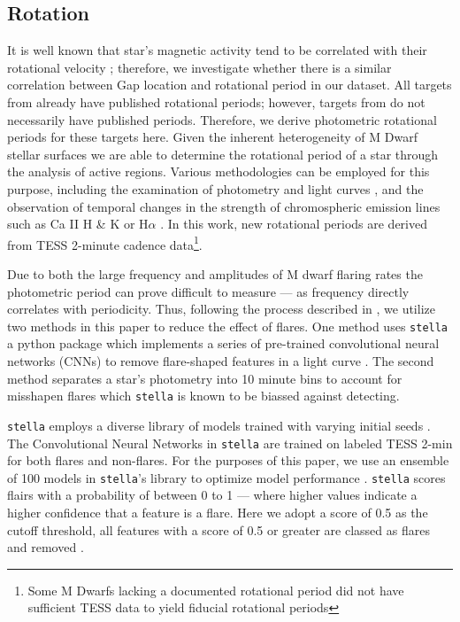 \subsection{Rotation}
It is well known that star's magnetic activity tend to be correlated with their
rotational velocity \citep{Vaughan1981, Newton2016, Astudillo-Defru2017,
Houdebine2017, Boudreaux2022}; therefore, we investigate whether there is a
similar correlation between Gap location and rotational period in our dataset.
All targets from \citet{Boudreaux2022} already have published rotational
periods; however, targets from \citet{Perdelwitz2021} do not necessarily have
published periods. Therefore, we derive photometric rotational periods for
these targets here. Given the inherent heterogeneity of M Dwarf stellar
surfaces \citep{Boisse2011, Robertson2020} we are able to determine the rotational period
of a star through the analysis of active regions. Various methodologies can be
employed for this purpose, including the examination of photometry and light
curves \citep[e.g.,][]{Newton2016}, and the observation of temporal changes in
the strength of chromospheric emission lines such as Ca II H \& K or H$\alpha$
\citep[e.g.,][]{2019A&A...623A..24F,2023MNRAS.518.3147K}. In this work, new rotational periods
are derived from TESS 2-minute cadence data\footnote{Some M Dwarfs lacking a
documented rotational period did not have sufficient TESS data to yield
fiducial rotational periods}.

Due to both the large frequency and amplitudes of M dwarf flaring rates the
photometric period can prove difficult to measure --- as frequency directly
correlates with periodicity. Thus, following the process described in
\citet{2023AJ....165..192G}, we utilize two methods in this paper to reduce the
effect of flares. One method uses \texttt{stella} a python package which
implements a series of pre-trained convolutional neural networks (CNNs) to
remove flare-shaped features in a light curve \citep{FeinsteinStella2020}. The
second method separates a star's photometry into 10 minute bins to account for
misshapen flares which \texttt{stella} is known to be biassed against detecting.

\texttt{stella}  employs a diverse library of models trained with varying
initial seeds \citep{FeinsteinFlare2020,FeinsteinStella2020}. The Convolutional
Neural Networks in \texttt{stella} are trained on labeled TESS 2-min for both
flares and non-flares. For the purposes of this paper, we use an ensemble of
100 models in \texttt{stella}'s library to optimize model performance
\citep[][for further detail]{FeinsteinFlare2020}. \texttt{stella} scores
flairs with a probability of between 0 to 1 --- where higher values indicate a
higher confidence that a feature is a flare. Here we adopt a score of 0.5 as
the cutoff threshold, all features with a score of 0.5 or greater are classed
as flares and removed \citep[e.g.][]{FeinsteinFlare2020}.


